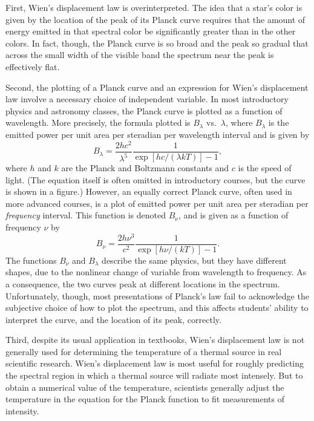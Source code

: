 \documentclass[12pt,aps,prb,preprint]{revtex4}   %
\begin{document}
First, Wien's displacement law is overinterpreted.  
The idea that a star's color is given by the location of the peak of its Planck curve requires that the amount of energy emitted in that spectral color be significantly greater than in the other colors.  In fact, though, the Planck curve is so broad and the peak so gradual that across the small width of the visible band the spectrum near the peak is effectively flat.

Second, the plotting of a Planck curve and an expression for Wien's displacement law involve a necessary choice of independent variable.  In most introductory physics and astronomy classes, the Planck curve is plotted as a function of wavelength.
More precisely, the formula plotted is
$B_\lambda$ vs.\ $\lambda$, where $B_\lambda$ is the emitted power per unit area per steradian per wavelength interval and is given by
\begin{equation}
\label{Blam}
B_\lambda =\frac{2hc^2}{\lambda^5}\frac{1}{\exp[hc/(\lambda kT)]-1},
\end{equation}
where $h$ and $k$ are the Planck and Boltzmann constants and $c$ is the speed of light.  (The equation itself is often omitted in introductory courses, but the curve is shown in a figure.)
However, an equally correct Planck curve, often used in more advanced courses, is a plot of emitted power per unit area per steradian per 
{\it frequency} interval.  This function is denoted $B_\nu$, and is given as a function of frequency $\nu$ by
\begin{equation}
\label{Bnu}
B_\nu =\frac{2h\nu^3}{c^2}\frac{1}{\exp[h\nu/(kT)]-1}.
\end{equation}
The functions $B_\nu$ and $B_\lambda$ describe the same physics, but they have different shapes, due to the nonlinear change of variable from wavelength to frequency.  As a consequence, the two curves peak at different locations in the spectrum.  Unfortunately, though, most presentations of Planck's law fail to acknowledge the subjective choice of how to plot the spectrum, and this affects students' ability to interpret the curve, and the location of its peak, correctly.

Third, despite its usual application in textbooks,  
Wien's displacement law is not generally used for determining the temperature of a thermal source in real scientific research.  
Wien's displacement law is most useful for roughly predicting the spectral region in which a thermal source will radiate most intensely.  But to obtain a numerical value of the temperature, scientists generally 
adjust the temperature in the equation for the Planck function to fit measurements of intensity.
 
\end{document}
